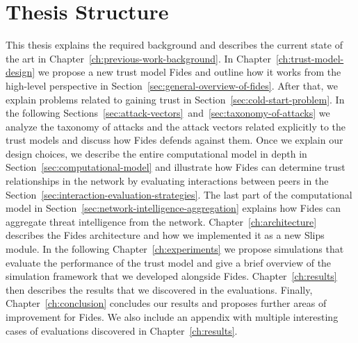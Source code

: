 \section{Thesis Structure}
\label{sec:thesis-structure}
This thesis explains the required background and describes the current state of the art in Chapter~\ref{ch:previous-work-background}.
In Chapter~\ref{ch:trust-model-design} we propose a new trust model Fides and outline how it works from the high-level perspective in Section~\ref{sec:general-overview-of-fides}.
After that, we explain problems related to gaining trust in Section~\ref{sec:cold-start-problem}.
In the following Sections~\ref{sec:attack-vectors}~and~\ref{sec:taxonomy-of-attacks} we analyze the taxonomy of attacks and the attack vectors related explicitly to the trust models and discuss how Fides defends against them.
Once we explain our design choices, we describe the entire computational model in depth in Section~\ref{sec:computational-model} and illustrate how Fides can determine trust relationships in the network by evaluating interactions between peers in the Section~\ref{sec:interaction-evaluation-strategies}.
The last part of the computational model in Section~\ref{sec:network-intelligence-aggregation} explains how Fides can aggregate threat intelligence from the network.
Chapter~\ref{ch:architecture} describes the Fides architecture and how we implemented it as a new Slips module.
In the following Chapter~\ref{ch:experiments} we propose simulations that evaluate the performance of the trust model and give a brief overview of the simulation framework that we developed alongside Fides.
Chapter~\ref{ch:results} then describes the results that we discovered in the evaluations. Finally, Chapter~\ref{ch:conclusion} concludes our results and proposes further areas of improvement for Fides. 
We also include an appendix with multiple interesting cases of evaluations discovered in Chapter~\ref{ch:results}.

\newpage
